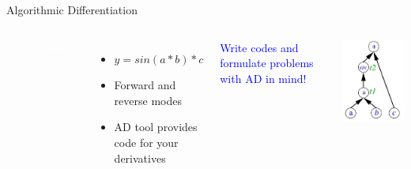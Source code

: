 \documentclass[handout,aspectratio=54]{beamer}
\numberwithin{theorem}{section}
\begin{document}
\begin{frame}{Algorithmic Differentiation}

\begin{columns}
\colorbox[rgb]{0.5,0.6,0.7}{\textcolor{white}{Computational Graph}}
\begin{itemize}
\item  $y=sin(a*b)*c$
\item  Forward and reverse modes
\item  AD tool provides code for your derivatives
\end{itemize}
\textcolor{blue}{Write codes and formulate problems with AD in mind!}

\includegraphics[width=\textwidth]{fig/7.jpg}
\end{columns}


\end{frame}
\end{document}

